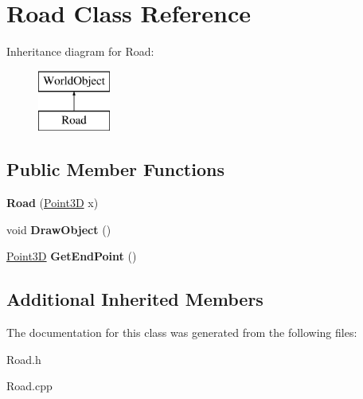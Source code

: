 \hypertarget{class_road}{\section{Road Class Reference}
\label{class_road}
}
Inheritance diagram for Road\+:\begin{figure}[H]
\begin{center}
\leavevmode
\includegraphics[height=2.000000cm]{class_road}
\end{center}
\end{figure}
\subsection*{Public Member Functions}
\begin{DoxyCompactItemize}
\item 
\hypertarget{class_road_a90be7d4371f8026017d3f6b819eeb688}{{\bfseries Road} (\hyperlink{struct_point3_d}{Point3\+D} x)}\label{class_road_a90be7d4371f8026017d3f6b819eeb688}

\item 
\hypertarget{class_road_adff20b6c1061106d116f624103650ec6}{void {\bfseries Draw\+Object} ()}\label{class_road_adff20b6c1061106d116f624103650ec6}

\item 
\hypertarget{class_road_a6e70d66fa043f061218a013a2a7c24c5}{\hyperlink{struct_point3_d}{Point3\+D} {\bfseries Get\+End\+Point} ()}\label{class_road_a6e70d66fa043f061218a013a2a7c24c5}

\end{DoxyCompactItemize}
\subsection*{Additional Inherited Members}


The documentation for this class was generated from the following files\+:\begin{DoxyCompactItemize}
\item 
Road.\+h\item 
Road.\+cpp\end{DoxyCompactItemize}
